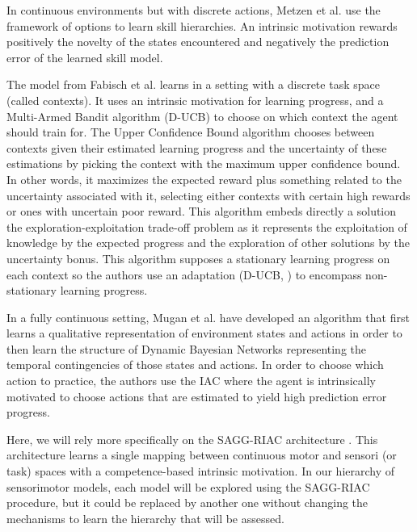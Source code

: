 \documentclass[conference]{include/IEEEtran}
\begin{document}
		In continuous environments but with discrete actions, Metzen et al. \cite{metzen2013} use the framework of options \cite{sutton1999between} 
		to learn skill hierarchies. 
		An intrinsic motivation rewards positively the novelty of the states encountered and negatively the prediction error of the learned skill model.
		
		The model from Fabisch et al. \cite{fabisch2014active} learns in a setting with a discrete task space (called contexts).
		It uses an intrinsic motivation for learning progress, and a Multi-Armed Bandit algorithm (D-UCB) to choose on which context the agent should train for.
		The Upper Confidence Bound algorithm chooses between contexts given their estimated learning progress and the uncertainty of these estimations
		by picking the context with the maximum upper confidence bound.
		In other words, it maximizes the expected reward plus something related to the uncertainty associated with it, selecting either contexts with 
		certain high rewards or ones with uncertain poor reward.
		This algorithm embeds directly a solution the exploration-exploitation trade-off problem as it represents the exploitation 
		of knowledge by the expected progress and the exploration of other solutions by the uncertainty bonus. 
		This algorithm supposes a stationary learning progress on each context so the authors use an adaptation 
		(D-UCB, \cite{kocsis2006discounted}) to encompass non-stationary learning progress.
		
		In a fully continuous setting, Mugan et al. \cite{mugan} have developed an algorithm that first learns a qualitative representation of environment states
		and actions in order to then learn the structure of Dynamic Bayesian Networks representing the temporal contingencies of those states and actions.
		In order to choose which action to practice, the authors use the IAC \cite{oudeyer_intrinsic_2007} where the agent 
		is intrinsically motivated to choose actions that are estimated to yield high prediction error progress.
		
		Here, we will rely more specifically on the SAGG-RIAC architecture \cite{baranes_active_2013}.
		This architecture learns a single mapping between continuous motor and sensori (or task) 
		spaces with a competence-based intrinsic motivation. 
		In our hierarchy of sensorimotor models, each model will be explored using the SAGG-RIAC procedure, but it could be replaced by another one 
		without changing the mechanisms to learn the hierarchy that will be assessed.
\end{document}
